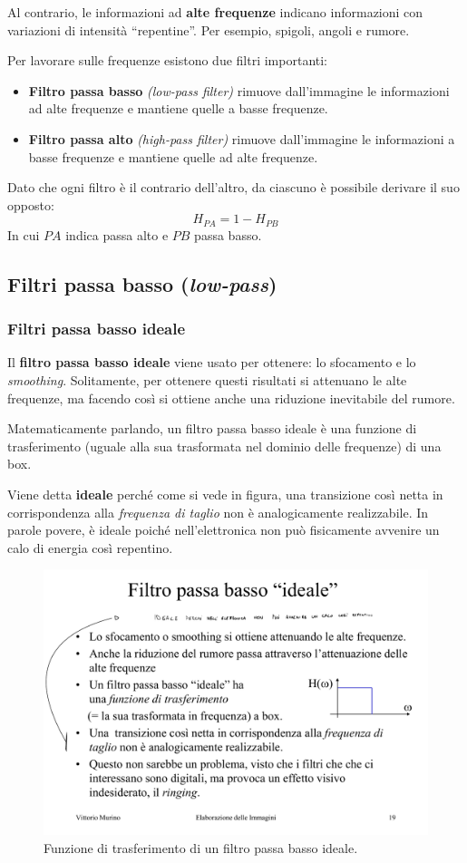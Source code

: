 \documentclass[a4paper]{article}
\newcommand{\dquotes}[1]{``#1''}
\begin{document}
	\noindent
	Al contrario, le informazioni ad \textbf{alte frequenze} indicano informazioni con variazioni di intensità \dquotes{repentine}. Per esempio, spigoli, angoli e rumore.\newline
	
	\noindent
	Per lavorare sulle frequenze esistono due filtri importanti:
	\begin{itemize}
		\item \textcolor{Red3}{\textbf{Filtro passa basso}} \emph{(low-pass filter)} rimuove dall'immagine le informazioni ad alte frequenze e mantiene quelle a basse frequenze.
		
		\item \textcolor{Red3}{\textbf{Filtro passa alto}} \emph{(high-pass filter)} rimuove dall'immagine le informazioni a basse frequenze e mantiene quelle ad alte frequenze.
	\end{itemize}
	Dato che ogni filtro è il contrario dell'altro, da ciascuno è possibile derivare il suo opposto:
	\begin{equation*}
		H_{PA} = 1 - H_{PB}
	\end{equation*}
	In cui $PA$ indica passa alto e $PB$ passa basso.\newpage
	
	\subsection{Filtri passa basso (\emph{low-pass})}
	
	\subsubsection{Filtri passa basso ideale}
	
	Il \textcolor{Red3}{\textbf{filtro passa basso ideale}} viene usato per ottenere: lo sfocamento e lo \emph{smoothing}. Solitamente, per ottenere questi risultati si attenuano le alte frequenze, ma facendo così si ottiene anche una riduzione inevitabile del rumore.\newline
	
	\noindent
	Matematicamente parlando, un filtro passa basso ideale è una funzione di trasferimento (uguale alla sua trasformata nel dominio delle frequenze) di una box.\newline
	
	\noindent
	Viene detta \textbf{ideale} perché come si vede in figura, una transizione così netta in corrispondenza alla \emph{frequenza di taglio} non è analogicamente realizzabile. In parole povere, è ideale poiché nell'elettronica non può fisicamente avvenire un calo di energia così repentino.
	\begin{figure}[!htp]
		\centering
		\includegraphics[width=.4\textwidth]{img/box_filtro_passa_bassa_ideale.pdf}
		\caption{Funzione di trasferimento di un filtro passa basso ideale.}
	\end{figure}
\end{document}
